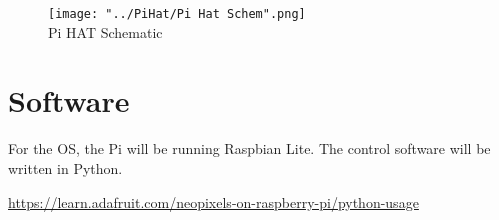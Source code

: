 \documentclass[a4paper,openany,oneside,nomultitoc]{dndbook}
\begin{document}
\begin{figure}[hb]
	\begin{center}
		\texttt{[image: "../PiHat/Pi Hat Schem".png]}\\
		{Pi HAT Schematic}
	\end{center}
\end{figure}

\FloatBarrier
\chapter{Software}
\FloatBarrier
\begin{multicols*}{2}

For the OS, the Pi will be running Raspbian Lite.  The control software will be written in Python.

\url{https://learn.adafruit.com/neopixels-on-raspberry-pi/python-usage}

\end{multicols*}
\end{document}
